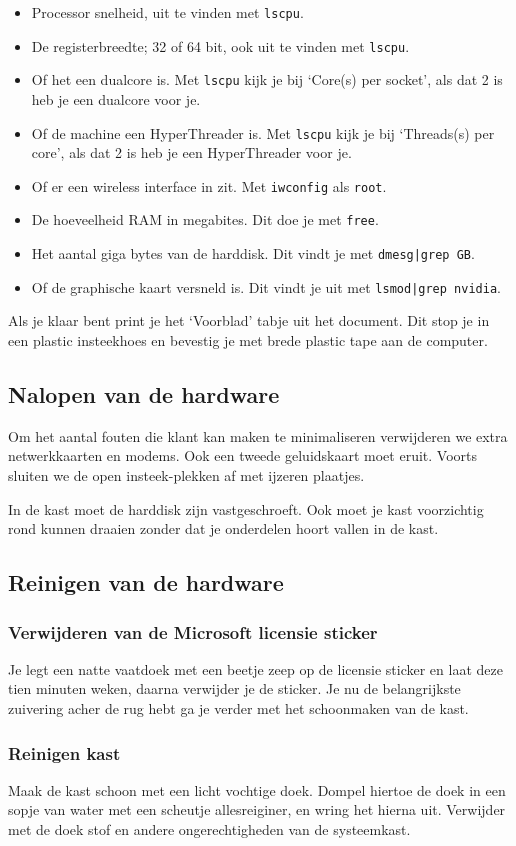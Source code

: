 \begin{itemize}
	\item Processor snelheid, uit te vinden met \texttt{lscpu}.
	\item De registerbreedte; 32 of 64 bit, ook uit te vinden met \texttt{lscpu}.
	\item Of het een dualcore is. Met \texttt{lscpu} kijk je bij `Core(s) per socket', als dat 2 is heb je een dualcore voor je.
	\item Of de machine een HyperThreader is. Met \texttt{lscpu} kijk je bij `Threads(s) per core', als dat 2 is heb je een HyperThreader voor je. 
	\item Of er een wireless interface in zit. Met \texttt{iwconfig} als \texttt{root}.
	\item De hoeveelheid RAM in megabites. Dit doe je met \texttt{free}.
	\item Het aantal giga bytes van de harddisk. Dit vindt je met \texttt{dmesg|grep GB}.
	\item Of de graphische kaart versneld is. Dit vindt je uit met \texttt{lsmod|grep nvidia}.
\end{itemize}

Als je klaar bent print je het `Voorblad' tabje uit het document. Dit stop je in een plastic insteekhoes en bevestig je met brede plastic tape aan de computer.
\subsection{Nalopen van de hardware}
Om het aantal fouten die klant kan maken te minimaliseren verwijderen we extra netwerkkaarten en modems. Ook een tweede geluidskaart moet eruit. Voorts sluiten we de open insteek-plekken af met ijzeren plaatjes.

In de kast moet de harddisk zijn vastgeschroeft.
Ook moet je kast voorzichtig rond kunnen draaien zonder dat je onderdelen hoort vallen in de kast. 
\subsection{Reinigen van de hardware}
\subsubsection{Verwijderen van de Microsoft licensie sticker}
Je legt een natte vaatdoek met een beetje zeep op de licensie sticker en laat deze tien minuten weken, daarna verwijder je de sticker. Je nu de belangrijkste zuivering acher de rug hebt ga je verder met het schoonmaken van de kast.
\subsubsection{Reinigen kast}
Maak de kast schoon met een licht vochtige doek. Dompel hiertoe de doek in een sopje van water met een scheutje allesreiginer, en wring het hierna uit. Verwijder met de doek stof en andere ongerechtigheden van de systeemkast.
